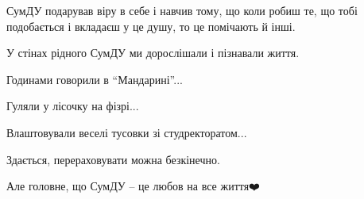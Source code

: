 СумДУ подарував віру в себе і навчив тому, що коли робиш те, що тобі
подобається і вкладаєш у це душу, то це помічають й інші.

У стінах рідного СумДУ ми дорослішали і пізнавали життя. 

Годинами говорили в \enquote{Мандарині}...

Гуляли у лісочку на фізрі...

Влаштовували веселі тусовки зі студректоратом...

Здається, перераховувати можна безкінечно. 

Але головне, що СумДУ – це любов на все життя❤️

